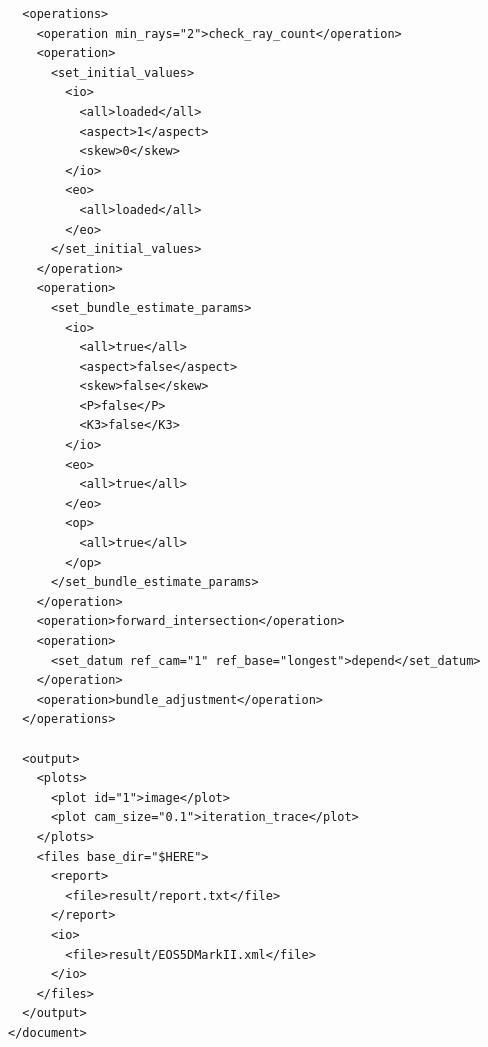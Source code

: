 \documentclass{article}
\begin{document}
\begin{verbatim}
  <operations>
    <operation min_rays="2">check_ray_count</operation>
    <operation>
      <set_initial_values>
        <io>
          <all>loaded</all>
          <aspect>1</aspect>
          <skew>0</skew>
        </io>
        <eo>
          <all>loaded</all>
        </eo>
      </set_initial_values>
    </operation>
    <operation>
      <set_bundle_estimate_params>
        <io>
          <all>true</all>
          <aspect>false</aspect>
          <skew>false</skew>
          <P>false</P>
          <K3>false</K3>
        </io>
        <eo>
          <all>true</all>
        </eo>
        <op>
          <all>true</all>
        </op>
      </set_bundle_estimate_params>
    </operation>
    <operation>forward_intersection</operation>
    <operation>
      <set_datum ref_cam="1" ref_base="longest">depend</set_datum>
    </operation>
    <operation>bundle_adjustment</operation>
  </operations>

  <output>
    <plots>
      <plot id="1">image</plot>
      <plot cam_size="0.1">iteration_trace</plot>
    </plots>
    <files base_dir="$HERE">
      <report>
        <file>result/report.txt</file>
      </report>
      <io>
        <file>result/EOS5DMarkII.xml</file>
      </io>
    </files>
  </output>
</document>
\end{verbatim}

\newpage
\end{document}
